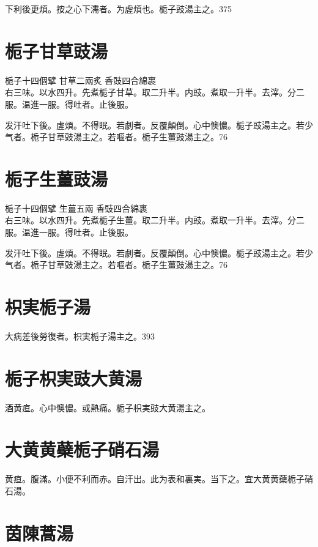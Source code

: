下利後更煩。按之心下濡者。为虗煩也。栀子{\khaaitp 豉}湯主之。375

\section{栀子甘草豉湯}

栀子{\scriptsize 十四個擘} 甘草{\scriptsize 二兩炙} 香豉{\scriptsize 四合綿裹}\\
右三味。以水四升。先煮栀子甘草。取二升半。内豉。煮取一升半。去滓。分二服。温進一服。得吐者。止後服。

发汗吐下後。虗煩。不得眠。若劇者。反覆顛倒。心中懊憹。栀子{\khaaitp 豉}湯主之。若少气者。栀子甘草{\khaaitp 豉}湯主之。若嘔者。栀子生薑{\khaaitp 豉}湯主之。76

\section{栀子生薑豉湯}

栀子{\scriptsize 十四個擘} 生薑{\scriptsize 五兩} 香豉{\scriptsize 四合綿裹}\\
右三味。以水四升。先煮栀子生薑。取二升半。内豉。煮取一升半。去滓。分二服。温進一服。得吐者。止後服。

发汗吐下後。虗煩。不得眠。若劇者。反覆顛倒。心中懊憹。栀子{\khaaitp 豉}湯主之。若少气者。栀子甘草{\khaaitp 豉}湯主之。若嘔者。栀子生薑{\khaaitp 豉}湯主之。76

\section{枳実栀子湯}

大病差後勞復者。枳実栀子湯主之。393

\section{栀子枳実豉大黄湯}

酒黄疸。心中懊憹。或熱痛。栀子{\khaaitp 枳実豉}大黄湯主之。

\section{大黄黄蘗栀子硝石湯}

黄疸。腹滿。小便不利而赤。自汗出。此为表和裏実。当下之。宜大黄{\khaaitp 黄蘗栀子}硝石湯。

\section{茵陳蒿湯}

